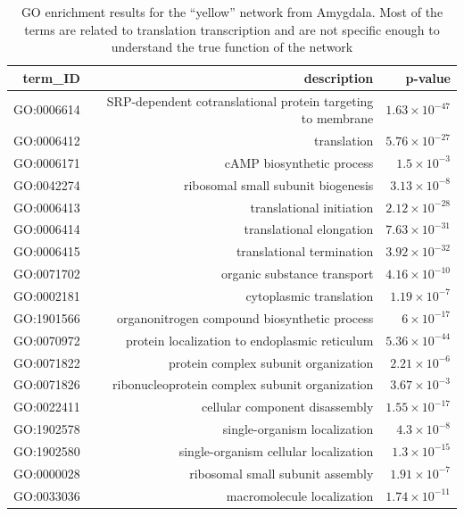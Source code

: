 \documentclass{book}
\begin{document}
	\begin{table}[htbp]
		\centering
		\caption[ enrichment results for the ``yellow'' network from Amygdala]{\gls{GO} enrichment results for the ``yellow'' network from Amygdala. 
			Most of the terms are related to translation transcription and are not specific enough to understand the true function of the network}
		\begin{tabular}{rrr}
			\toprule
			term\_ID & description & p-value \\
			\midrule
			GO:0006614 & SRP-dependent cotranslational protein targeting to membrane & $1.63\times 10^{-47}$ \\
			GO:0006412 & translation & $5.76\times 10^{-27}$ \\
			GO:0006171 & cAMP biosynthetic process & $1.5\times 10^{-3}$ \\
			GO:0042274 & ribosomal small subunit biogenesis & $3.13\times 10^{-8}$ \\
			GO:0006413 & translational initiation & $2.12\times 10^{-28}$ \\
			GO:0006414 & translational elongation & $7.63\times 10^{-31}$ \\
			GO:0006415 & translational termination & $3.92\times 10^{-32}$ \\
			GO:0071702 & organic substance transport & $4.16\times 10^{-10}$ \\
			GO:0002181 & cytoplasmic translation & $1.19\times 10^{-7}$ \\
			GO:1901566 & organonitrogen compound biosynthetic process & $6\times 10^{-17}$ \\
			GO:0070972 & protein localization to endoplasmic reticulum & $5.36\times 10^{-44}$ \\
			GO:0071822 & protein complex subunit organization & $2.21\times 10^{-6}$ \\
			GO:0071826 & ribonucleoprotein complex subunit organization & $3.67\times 10^{-3}$ \\
			GO:0022411 & cellular component disassembly & $1.55\times 10^{-17}$ \\
			GO:1902578 & single-organism localization & $4.3\times 10^{-8}$ \\
			GO:1902580 & single-organism cellular localization & $1.3\times 10^{-15}$ \\
			GO:0000028 & ribosomal small subunit assembly & $1.91\times 10^{-7}$ \\
			GO:0033036 & macromolecule localization & $1.74\times 10^{-11}$ \\

\end{tabular}
\end{table}
\end{document}
